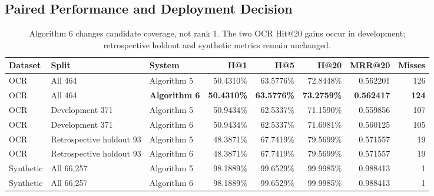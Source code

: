 \documentclass[11pt,a4paper]{article}
\begin{document}
\subsection{Paired Performance and Deployment Decision}

\begin{table}[htbp]
\centering
\small
{\setlength{\tabcolsep}{3.5pt}
\begin{tabular}{@{}lllrrrrr@{}}
\toprule
\textbf{Dataset} & \textbf{Split} & \textbf{System} &
\textbf{H@1} & \textbf{H@5} & \textbf{H@20} & \textbf{MRR@20} &
\textbf{Misses} \\
\midrule
OCR & All 464 & Algorithm 5 & 50.4310\% & 63.5776\% & 72.8448\% & 0.562201 & 126 \\
OCR & All 464 & \textbf{Algorithm 6} & \textbf{50.4310\%} & \textbf{63.5776\%} & \textbf{73.2759\%} & \textbf{0.562417} & \textbf{124} \\
OCR & Development 371 & Algorithm 5 & 50.9434\% & 62.5337\% & 71.1590\% & 0.559856 & 107 \\
OCR & Development 371 & Algorithm 6 & 50.9434\% & 62.5337\% & 71.6981\% & 0.560125 & 105 \\
OCR & Retrospective holdout 93 & Algorithm 5 & 48.3871\% & 67.7419\% & 79.5699\% & 0.571557 & 19 \\
OCR & Retrospective holdout 93 & Algorithm 6 & 48.3871\% & 67.7419\% & 79.5699\% & 0.571557 & 19 \\
Synthetic & All 66,257 & Algorithm 5 & 98.1889\% & 99.6529\% & 99.9985\% & 0.988413 & 1 \\
Synthetic & All 66,257 & Algorithm 6 & 98.1889\% & 99.6529\% & 99.9985\% & 0.988413 & 1 \\
\bottomrule
\end{tabular}
}
\caption{Algorithm 6 changes candidate coverage, not rank 1. The two OCR
Hit@20 gains occur in development; retrospective holdout and synthetic metrics
remain unchanged.}
\label{tab:a6-performance}
\end{table}
\end{document}

